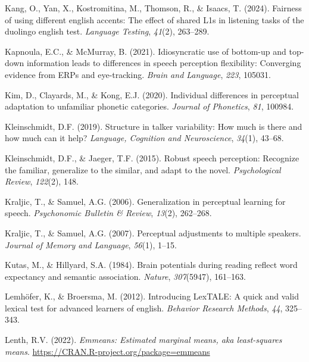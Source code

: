 \documentclass[
  12pt,
  twoside]{article}
\newlength{\cslhangindent}
\newlength{\cslentryspacingunit} %
\newenvironment{CSLReferences}[2] %
 {%
  \setlength{\parindent}{0pt}
  \ifodd #1
  \let\oldpar\par
  \def\par{\hangindent=\cslhangindent\oldpar}
  \fi
  \setlength{\parskip}{#2\cslentryspacingunit}
 }%
 {}
\begin{document}
\begin{CSLReferences}{1}{0}
\leavevmode{}%
Kang, O., Yan, X., Kostromitina, M., Thomson, R., \& Isaacs, T. (2024). Fairness of using different english accents: The effect of shared L1s in listening tasks of the duolingo english test. \emph{Language Testing}, \emph{41}(2), 263--289.

\leavevmode{}%
Kapnoula, E.C., \& McMurray, B. (2021). Idiosyncratic use of bottom-up and top-down information leads to differences in speech perception flexibility: Converging evidence from ERPs and eye-tracking. \emph{Brain and Language}, \emph{223}, 105031.

\leavevmode{}%
Kim, D., Clayards, M., \& Kong, E.J. (2020). Individual differences in perceptual adaptation to unfamiliar phonetic categories. \emph{Journal of Phonetics}, \emph{81}, 100984.

\leavevmode{}%
Kleinschmidt, D.F. (2019). Structure in talker variability: How much is there and how much can it help? \emph{Language, Cognition and Neuroscience}, \emph{34}(1), 43--68.

\leavevmode{}%
Kleinschmidt, D.F., \& Jaeger, T.F. (2015). Robust speech perception: Recognize the familiar, generalize to the similar, and adapt to the novel. \emph{Psychological Review}, \emph{122}(2), 148.

\leavevmode{}%
Kraljic, T., \& Samuel, A.G. (2006). Generalization in perceptual learning for speech. \emph{Psychonomic Bulletin \& Review}, \emph{13}(2), 262--268.

\leavevmode{}%
Kraljic, T., \& Samuel, A.G. (2007). Perceptual adjustments to multiple speakers. \emph{Journal of Memory and Language}, \emph{56}(1), 1--15.

\leavevmode{}%
Kutas, M., \& Hillyard, S.A. (1984). Brain potentials during reading reflect word expectancy and semantic association. \emph{Nature}, \emph{307}(5947), 161--163.

\leavevmode{}%
Lemhöfer, K., \& Broersma, M. (2012). Introducing {LexTALE}: A quick and valid lexical test for advanced learners of english. \emph{Behavior Research Methods}, \emph{44}, 325--343.

\leavevmode{}%
Lenth, R.V. (2022). \emph{Emmeans: Estimated marginal means, aka least-squares means}. \url{https://CRAN.R-project.org/package=emmeans}


\end{CSLReferences}
\end{document}
